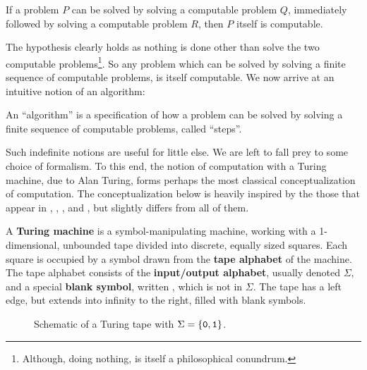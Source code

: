\begin{hypothesis} \label{ths:problem-composition} If a problem $P$ can be
solved by solving a computable problem $Q$, immediately followed by solving a
computable problem $R$, then $P$ itself is computable. \end{hypothesis}

The hypothesis clearly holds as nothing is done other than solve the two
computable problems\footnote{Although, doing nothing, is itself a philosophical
conundrum.}.  So any problem which can be solved by solving a finite sequence
of computable problems, is itself computable. We now arrive at an intuitive
notion of an algorithm:

\begin{notion} \label{ntn:problem-algorithm} An ``algorithm'' is a
specification of how a problem can be solved by solving a finite sequence of
computable problems, called ``steps''.\end{notion}

Such indefinite notions are useful for little else. We are left to fall prey to
some choice of formalism. To this end, the notion of computation with a Turing
machine, due to Alan Turing\cite{turing-1936-7}, forms perhaps the most
classical conceptualization of computation. The conceptualization below is
heavily inspired by the those that appear in \cite{tourlakis-1984},
\cite{jones-1997}, \cite{homer-selman-2011}, and \cite{sipser-2013}, but
slightly differs from all of them.

A \textbf{Turing machine} is a symbol-manipulating machine, working with a
1-dimensional, unbounded tape divided into discrete, equally sized squares.
Each square is occupied by a symbol drawn from the \textbf{tape alphabet} of
the machine.  The tape alphabet consists of the \textbf{input/output alphabet},
usually denoted $\Sigma$, and a special \textbf{blank symbol}, written \blank,
which is not in $\Sigma$. The tape has a left edge, but extends into infinity
to the right, filled with blank symbols.


\begin{figure}[h!]
\centering
{}
\caption[]{Schematic of a Turing tape with $\Sigma=\mathopen{}\left\{{\mathtt{0},\mathtt{1}}\right\}\mathclose{}$.}
\label{fig:turing-tape}
\end{figure}

